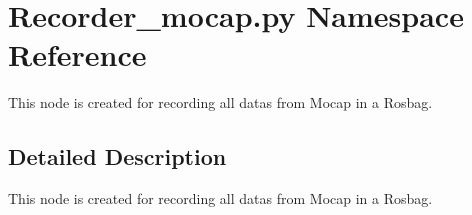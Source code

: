 \hypertarget{namespaceRecorder__mocap_1_1py}{}\section{Recorder\+\_\+mocap.\+py Namespace Reference}
\label{namespaceRecorder__mocap_1_1py}


This node is created for recording all datas from Mocap in a Rosbag.  




\subsection{Detailed Description}
This node is created for recording all datas from Mocap in a Rosbag. 


